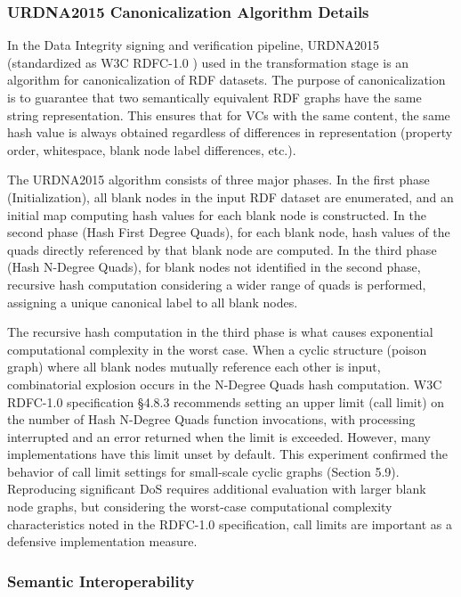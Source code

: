 \documentclass[conference]{IEEEtran}
\begin{document}
\subsubsection{URDNA2015 Canonicalization Algorithm Details}

In the Data Integrity signing and verification pipeline, URDNA2015 (standardized as W3C RDFC-1.0 \cite{ref4}) used in the transformation stage is an algorithm for canonicalization of RDF datasets. The purpose of canonicalization is to guarantee that two semantically equivalent RDF graphs have the same string representation. This ensures that for VCs with the same content, the same hash value is always obtained regardless of differences in representation (property order, whitespace, blank node label differences, etc.).

The URDNA2015 algorithm consists of three major phases. In the first phase (Initialization), all blank nodes in the input RDF dataset are enumerated, and an initial map computing hash values for each blank node is constructed. In the second phase (Hash First Degree Quads), for each blank node, hash values of the quads directly referenced by that blank node are computed. In the third phase (Hash N-Degree Quads), for blank nodes not identified in the second phase, recursive hash computation considering a wider range of quads is performed, assigning a unique canonical label to all blank nodes.

The recursive hash computation in the third phase is what causes exponential computational complexity in the worst case. When a cyclic structure (poison graph) where all blank nodes mutually reference each other is input, combinatorial explosion occurs in the N-Degree Quads hash computation. W3C RDFC-1.0 specification §4.8.3 recommends setting an upper limit (call limit) on the number of Hash N-Degree Quads function invocations, with processing interrupted and an error returned when the limit is exceeded. However, many implementations have this limit unset by default. This experiment confirmed the behavior of call limit settings for small-scale cyclic graphs (Section 5.9). Reproducing significant DoS requires additional evaluation with larger blank node graphs, but considering the worst-case computational complexity characteristics noted in the RDFC-1.0 specification, call limits are important as a defensive implementation measure.

\subsubsection{Semantic Interoperability}
\end{document}
